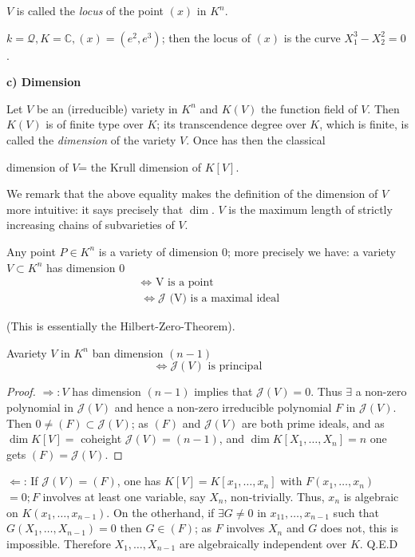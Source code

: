   $V$ is called the \textit{locus} of the point $(x)$ in $K^n$.

  \begin{example*}%
    $k = \mathcal{Q}, K=\mathbb{C}, (x) =(e^2, e^3)$; then the locus of
    $(x)$ is the curve $X^3_1- X_2^2 = 0$. 
  \end{example*}

\noindent\textbf{c) Dimension}

Let $V$ be an (irreducible) variety in $K^n$ and $K(V)$ the function
field of $V$. Then $K(V)$ is of finite type over $K$; its
transcendence degree over $K$, which is finite, is called the
\textit{dimension} of the variety $V$. Once has then the classical  
 
\begin{theorem*}%
  dimension of $V$= the Krull dimension of $K[V]$.
\end{theorem*}

We remark that the above equality makes the definition of the
dimension of $V$ more intuitive: it says precisely that $\dim$. $V$ is
the maximum length of strictly increasing chains of subvarieties of
$V$. 

Any point $P  \in   K^n$ is a variety of dimension 0; more precisely
we have: a variety $V \subset K^n$ has dimension 0 
\begin{align*}
  & \Leftrightarrow  \text{ V is  a  point }\\
  &\Leftrightarrow  \mathcal{J} \text{ (V) is  a  maximal  ideal }
\end{align*}

(This is essentially the Hilbert-Zero-Theorem).
\begin{prop*} %
  A\pageoriginale variety $V$ in $K^n$ ban dimension $(n-1)$  
  $$
  \Leftrightarrow \mathcal{J} (V)\text{ is principal}
  $$
\end{prop*}

\begin{proof} %
  $\Rightarrow: V$ has dimension $(n-1)$ implies that $\mathcal{J}
  (V)=0$. Thus $\exists$ a non-zero polynomial in $\mathcal{J}(V)$ and
  hence a non-zero irreducible polynomial $F$ in
  $\mathcal{J}(V)$. Then $0 \neq (F) \subset \mathcal{J} (V)$; as
  $(F)$ and $\mathcal{J}(V)$ are both prime ideals, and as $\dim K
  [V]=$ coheight $\mathcal{J} (V)= (n-1)$, and $ \dim K
  [X_1,\ldots,X_n] = n$ one gets \textbf{$(F) = \mathcal{J}(V)$}. 
\end{proof}

$\Leftarrow $: If $\mathcal{J}(V) = (F)$, one has $K[V] = K
[x_1,\ldots ,x_n]$ with  $F(x_1,\ldots, x_n)$ $=0; F$ involves at least
one variable, say $X_n$, non-trivially. Thus, $x_n$ is algebraic on
$K(x_1,\ldots,x_{n-1})$. On the otherhand, if $\exists G \neq 0$ in
$x_{11},\ldots, x_{n-1}$ such that $G (X_1,\ldots,X_{n-1}) = 0$ then $G
\in (F)$; as $F$ involves $X_n$ and $G$ does not, this is
impossible. Therefore $X_1,\ldots ,X_{n-1}$ are algebraically
independent over $K$. \hfill Q.E.D

